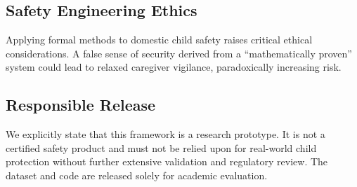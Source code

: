 \subsection{Safety Engineering Ethics}
Applying formal methods to domestic child safety raises critical ethical considerations. A false sense of security derived from a ``mathematically proven'' system could lead to relaxed caregiver vigilance, paradoxically increasing risk.

\subsection{Responsible Release}
We explicitly state that this framework is a research prototype. It is not a certified safety product and must not be relied upon for real-world child protection without further extensive validation and regulatory review. The dataset and code are released solely for academic evaluation.
